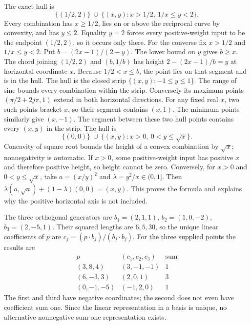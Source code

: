 The exact hull is
\[
 \{(1/2,2)\}\ \cup\ \{(x,y):x>1/2,\ 1/x\le y<2\}.
\]
Every combination has $x\ge1/2$, lies on or above the reciprocal curve by
convexity, and has $y\le2$. Equality $y=2$ forces every positive-weight
input to be the endpoint $(1/2,2)$, so it occurs only there.
For the converse fix $x>1/2$ and $1/x\le y<2$. Put
$b=(2x-1)/(2-y)$. The lower bound on $y$ gives $b\ge x$.
The chord joining $(1/2,2)$ and $(b,1/b)$ has height
$2-(2x-1)/b=y$ at horizontal coordinate $x$.
Because $1/2<x\le b$, the point lies on that segment and is in the hull.
The hull is the closed strip $\{(x,y):-1\le y\le1\}$.
The range of sine bounds every combination within the strip.
Conversely its maximum points $(\pi/2+2j\pi,1)$ extend in both horizontal
directions. For any fixed real $x$, two such points bracket $x$, so their
segment contains $(x,1)$. The minimum points similarly give $(x,-1)$.
The segment between these two hull points contains every $(x,y)$ in the strip.
The hull is
\[
 \{(0,0)\}\ \cup\ \{(x,y):x>0,\ 0<y\le\sqrt{x}\}.
\]
Concavity of square root bounds the height of a convex combination by
$\sqrt{x}$; nonnegativity is automatic. If $x>0$, some positive-weight
input has positive $x$ and therefore positive height, so height cannot be zero.
Conversely, for $x>0$ and $0<y\le\sqrt{x}$, take
$a=(x/y)^2$ and $\lambda=y^2/x\in(0,1]$.
Then $\lambda(a,\sqrt a)+(1-\lambda)(0,0)=(x,y)$.
This proves the formula and explains why the positive horizontal axis is not included.

The three orthogonal generators are
$b_1=(2,1,1)$, $b_2=(1,0,-2)$, $b_3=(2,-5,1)$.
Their squared lengths are $6,5,30$, so the unique linear coefficients of
$p$ are $c_j=(p\cdot b_j)/(b_j\cdot b_j)$.
For the three supplied points the results are
\[
 \begin{array}{c|c|c}
 p& (c_1,c_2,c_3)&\text{sum}\\\hline
 (3,8,4)&(3,-1,-1)&1\\
 (6,-3,3)&(2,0,1)&3\\
 (0,-1,-5)&(-1,2,0)&1
 \end{array}
\]
The first and third have negative coordinates; the second does not even
have coefficient sum one. Since the linear representation in a basis is
unique, no alternative nonnegative sum-one representation exists.

